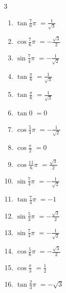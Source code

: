 \begin{multicols}{3}
\begin{enumerate}
  \item $\displaystyle \tan{\frac{7}{6}\pi}$
        $\displaystyle =\frac{1}{\sqrt{3}}$

  \item $\displaystyle \cos{\frac{7}{6}\pi}$
        $\displaystyle =-\frac{\sqrt{3}}{2}$

  \item $\displaystyle \sin{\frac{7}{4}\pi}$
        $\displaystyle =-\frac{1}{\sqrt{2}}$

  \item $\displaystyle \tan{\frac{\pi}{6}}$
        $\displaystyle =\frac{1}{\sqrt{3}}$

\columnbreak %

  \item $\displaystyle \tan{\frac{\pi}{6}}$
        $\displaystyle =\frac{1}{\sqrt{3}}$

  \item $\displaystyle \tan{0}$
        $\displaystyle =0$

  \item $\displaystyle \cos{\frac{5}{4}\pi}$
        $\displaystyle =-\frac{1}{\sqrt{2}}$

  \item $\displaystyle \cos{\frac{\pi}{2}}$
        $\displaystyle =0$

  \item $\displaystyle \cos{\frac{11}{6}\pi}$
        $\displaystyle =\frac{\sqrt{3}}{2}$

  \item $\displaystyle \sin{\frac{7}{4}\pi}$
        $\displaystyle =-\frac{1}{\sqrt{2}}$

  \item $\displaystyle \tan{\frac{7}{4}\pi}$
        $\displaystyle =-1$

  \item $\displaystyle \sin{\frac{5}{3}\pi}$
        $\displaystyle =-\frac{\sqrt{3}}{2}$

  \item $\displaystyle \sin{\frac{7}{4}\pi}$
        $\displaystyle =-\frac{1}{\sqrt{2}}$

  \item $\displaystyle \cos{\frac{5}{6}\pi}$
        $\displaystyle =-\frac{\sqrt{3}}{2}$

  \item $\displaystyle \cos{\frac{\pi}{3}}$
        $\displaystyle =\frac{1}{2}$

  \item $\displaystyle \tan{\frac{2}{3}\pi}$
        $\displaystyle =-\sqrt{3}$


\end{enumerate}
\end{multicols}
